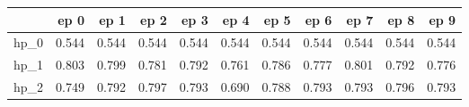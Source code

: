 \begin{tabular}{lrrrrrrrrrr}
\toprule
{} &   ep 0 &   ep 1 &   ep 2 &   ep 3 &   ep 4 &   ep 5 &   ep 6 &   ep 7 &   ep 8 &   ep 9 \\
\midrule
hp\_0 &  0.544 &  0.544 &  0.544 &  0.544 &  0.544 &  0.544 &  0.544 &  0.544 &  0.544 &  0.544 \\
hp\_1 &  0.803 &  0.799 &  0.781 &  0.792 &  0.761 &  0.786 &  0.777 &  0.801 &  0.792 &  0.776 \\
hp\_2 &  0.749 &  0.792 &  0.797 &  0.793 &  0.690 &  0.788 &  0.793 &  0.793 &  0.796 &  0.793 \\
\bottomrule
\end{tabular}

